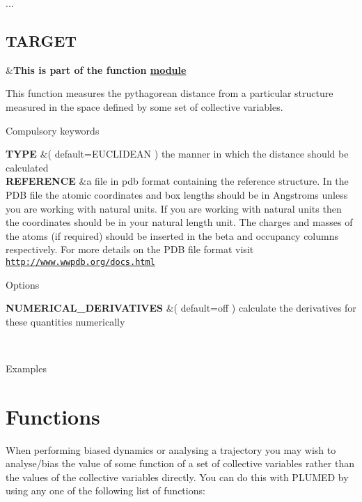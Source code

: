 ... \hypertarget{TARGET}{}\subsection{T\+A\+R\+G\+E\+T}\label{TARGET}
\begin{TabularC}{2}
\hline
&{\bfseries  This is part of the function \hyperlink{mymodules}{module }}   \\
\end{TabularC}
This function measures the pythagorean distance from a particular structure measured in the space defined by some set of collective variables.

\begin{DoxyParagraph}{Compulsory keywords}

\end{DoxyParagraph}
\begin{TabularC}{2}
\hline
{\bfseries  T\+Y\+P\+E } &( default=E\+U\+C\+L\+I\+D\+E\+A\+N ) the manner in which the distance should be calculated   \\
{\bfseries  R\+E\+F\+E\+R\+E\+N\+C\+E } &a file in pdb format containing the reference structure. In the P\+D\+B file the atomic coordinates and box lengths should be in Angstroms unless you are working with natural units. If you are working with natural units then the coordinates should be in your natural length unit. The charges and masses of the atoms (if required) should be inserted in the beta and occupancy columns respectively. For more details on the P\+D\+B file format visit \href{http://www.wwpdb.org/docs.html}{\tt http\+://www.\+wwpdb.\+org/docs.\+html}   \\
\end{TabularC}


\begin{DoxyParagraph}{Options}

\end{DoxyParagraph}
\begin{TabularC}{2}
\hline
{\bfseries  N\+U\+M\+E\+R\+I\+C\+A\+L\+\_\+\+D\+E\+R\+I\+V\+A\+T\+I\+V\+E\+S } &( default=off ) calculate the derivatives for these quantities numerically  

\\
\end{TabularC}


\begin{DoxyParagraph}{Examples}

\end{DoxyParagraph}
\hypertarget{Function}{}\section{Functions}\label{Function}
When performing biased dynamics or analysing a trajectory you may wish to analyse/bias the value of some function of a set of collective variables rather than the values of the collective variables directly. You can do this with P\+L\+U\+M\+E\+D by using any one of the following list of functions\+:

